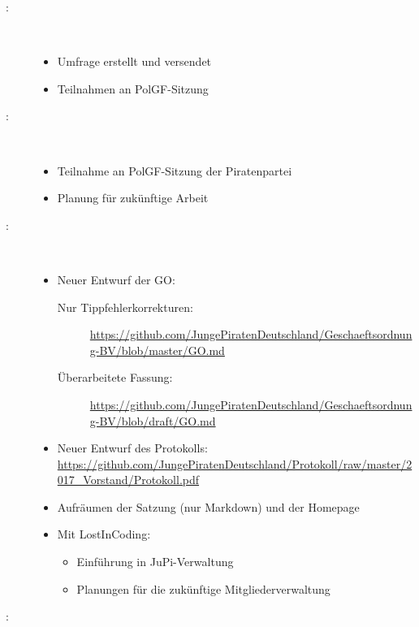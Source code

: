\begin{Protokoll}
    
    \begin{description}
        \item[:] \     
        \begin{itemize}
            \item Umfrage erstellt und versendet
            \item Teilnahmen an PolGF-Sitzung
        \end{itemize}
        \item[:] \     
        \begin{itemize}
            \item Teilnahme an PolGF-Sitzung der Piratenpartei
            \item Planung für zukünftige Arbeit
        \end{itemize}
        \item[\getPersonAsWebsiteLink{MiL}:] \     
        \begin{itemize}
           \item Neuer Entwurf der GO:
                 \begin{description}
                           \item[Nur Tippfehlerkorrekturen:]  \url{https://github.com/JungePiratenDeutschland/Geschaeftsordnung-BV/blob/master/GO.md}
                           \item[Überarbeitete Fassung:] \url{https://github.com/JungePiratenDeutschland/Geschaeftsordnung-BV/blob/draft/GO.md}
                    \end{description}
           \item Neuer Entwurf des Protokolls: \url{https://github.com/JungePiratenDeutschland/Protokoll/raw/master/2017_Vorstand/Protokoll.pdf}
           \item Aufräumen der Satzung (nur Markdown) und der Homepage
            \item Mit LostInCoding: 
                  \begin{itemize}
                           \item Einführung  in JuPi-Verwaltung
                           \item Planungen für die zukünftige Mitgliederverwaltung
                    \end{itemize}
        \end{itemize}
        \item[\getPersonAsWebsiteLink{ElH}:] \     
        \begin{itemize}

\end{itemize}
\end{description}
\end{Protokoll}
